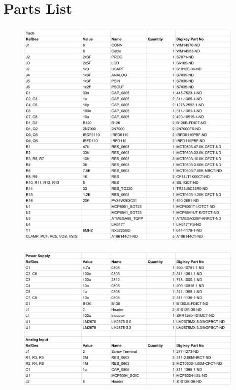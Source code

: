 \documentclass[11pt]{article}
\begin{document}
\section{Parts List}
\label{app:parts}
\begin{figure}[H]
    \centering
    \includegraphics[width=\textwidth]{documents/bom_1}
\end{figure}

\begin{figure}[H]
    \centering
    \includegraphics[width=\textwidth]{documents/bom_2}
\end{figure}
\end{document}
